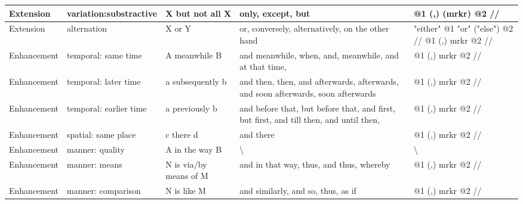 \begin{landscape}
\begin{longtable}{|l|l|p{3cm}|p{5cm}|p{5cm}|}
			Extension   & variation:substractive & X but not all X                      & only, except, but                                                                      & @1 (,) (mrkr) @2 //                                                                     \\ \hline
			Extension   & alternation            & X or Y                               & or, conversely, alternatively, on the other hand                                       & "either" @1 "or" ("else") @2 // @1 (,) mrkr @2 //                                       \\ \hline
			Enhancement & temporal: same time    & A meanwhile B                        & and meanwhile, when, and, meanwhile, and at that time,                                 & @1 (,) mrkr @2 //                                                                       \\ \hline
			Enhancement & temporal: later time   & a subsequently b                     & and then, then, and afterwards, afterwards, and soon afterwards, soon afterwards       & @1 (,) mrkr @2 //                                                                       \\ \hline
			Enhancement & temporal: earlier time & a previously b                       & and before that, but before that, and first, but first, and till then, and until then, & @1 (,) mrkr @2 //                                                                       \\ \hline
			Enhancement & spatial: same place    & c there d                            & and there                                                                              & @1 (,) mrkr @2 //                                                                       \\ \hline
			Enhancement & manner: quality        & A in the way B                       & \textbackslash                                                                         & \textbackslash                                                                          \\ \hline
			Enhancement & manner: means          & N is via/by means of M               & and in that way, thus, and thus, whereby                                               & @1 (,) mrkr @2 //                                                                       \\ \hline
			Enhancement & manner: comparison     & N is like M                          & and similarly, and so, thus, as if                                                     & @1 (,) mrkr @2 //                                                                       \\ \hline

\end{longtable}
\end{landscape}
